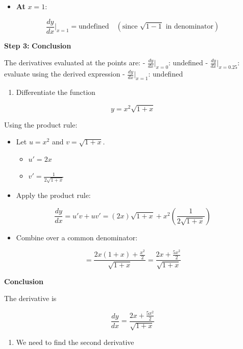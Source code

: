 \documentclass[
]{book}
\providecommand{\tightlist}{%
  \setlength{\itemsep}{0pt}\setlength{\parskip}{0pt}}
\theoremstyle{definition}
\theoremstyle{definition}
\theoremstyle{definition}
\theoremstyle{definition}
\theoremstyle{remark}
\begin{document}
\begin{itemize}
\tightlist
\item
  \textbf{At} \(x = 1\):
\end{itemize}

\[
    \frac{dy}{dx}\bigg|_{x=1} = \text{undefined} \quad (\text{since } \sqrt{1 - 1} \text{ in denominator})
\]

\textbf{Step 3:} \textbf{Conclusion}

The derivatives evaluated at the points are: - \(\frac{dy}{dx}\bigg|_{x=0}\): undefined - \(\frac{dy}{dx}\bigg|_{x=0.25}\): evaluate using the derived expression - \(\frac{dy}{dx}\bigg|_{x=1}\): undefined

\begin{enumerate}
\def\labelenumi{\arabic{enumi}.}
\setcounter{enumi}{7}
\tightlist
\item
  Differentiate the function
\end{enumerate}

\[
y = x^2\sqrt{1 + x}
\]

Using the product rule:

\begin{itemize}
\item
  Let \(u = x^2\) and \(v = \sqrt{1 + x}\).

  \begin{itemize}
  \tightlist
  \item
    \(u' = 2x\)
  \item
    \(v' = \frac{1}{2\sqrt{1 + x}}\)
  \end{itemize}
\item
  Apply the product rule:
\end{itemize}

\[
\frac{dy}{dx} = u'v + uv' = (2x)\sqrt{1 + x} + x^2\left(\frac{1}{2\sqrt{1 + x}}\right)
\]

\begin{itemize}
\tightlist
\item
  Combine over a common denominator:
\end{itemize}

\[
= \frac{2x(1 + x) + \frac{x^2}{2}}{\sqrt{1 + x}} = \frac{2x + \frac{5x^2}{2}}{\sqrt{1 + x}}
\]

\textbf{Conclusion}

The derivative is

\[
\frac{dy}{dx} = \frac{2x + \frac{5x^2}{2}}{\sqrt{1 + x}}
\]

\begin{enumerate}
\def\labelenumi{\arabic{enumi}.}
\setcounter{enumi}{8}
\tightlist
\item
  We need to find the second derivative
\end{enumerate}
\end{document}
